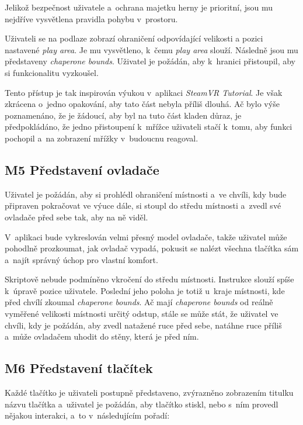 Jelikož bezpečnost uživatele a~ochrana majetku herny je prioritní, jsou mu nejdříve
vysvětlena pravidla pohybu v~prostoru.

Uživateli se na podlaze zobrazí ohraničení odpovídající velikosti a
pozici nastavené \emph{play area}. Je mu vysvětleno, k~čemu \emph{play
area} slouží. Následně jsou mu představeny \emph{chaperone bounds}.
Uživatel je požádán, aby k~hranici přistoupil, aby si funkcionalitu
vyzkoušel.

Tento přístup je tak inspirován výukou v~aplikaci \emph{SteamVR
Tutorial}. Je však zkrácena o~jedno opakování, aby tato část nebyla
příliš dlouhá. Ač bylo výše poznamenáno, že je žádoucí, aby byl na tuto
část kladen důraz, je předpokládáno, že jedno přistoupení k~mřížce uživateli
stačí k~tomu, aby funkci pochopil a~na zobrazení mřížky v~budoucnu
reagoval.

\subsection{M5 Představení
ovladače}\label{m5-pux159edstavenuxed-ovladaux10de}

Uživatel je požádán, aby si prohlédl ohraničení místnosti a~ve chvíli,
kdy bude připraven pokračovat ve výuce dále, si stoupl do středu
místnosti a~zvedl své ovladače před sebe tak, aby na ně viděl.

V~aplikaci bude vykreslován velmi přesný model ovladače, takže uživatel
může pohodlně prozkoumat, jak ovladač vypadá, pokusit se nalézt všechna
tlačítka sám a~najít správný úchop pro vlastní komfort.

Skriptově nebude podmíněno vkročení do středu místnosti.
Instrukce slouží spíše k~úpravě pozice uživatele. Poslední jeho poloha
je totiž u~kraje místnosti, kde před chvílí zkoumal \emph{chaperone
bounds}. Ač mají \emph{chaperone bounds} od reálně vyměřené velikosti místnosti
určitý odstup, stále se může stát, že uživatel ve chvíli, kdy je
požádán, aby zvedl natažené ruce před sebe, natáhne ruce příliš a~může
ovladačem uhodit do stěny, která je před ním.

\subsection{M6 Představení
tlačítek}\label{m6-pux159edstavenuxed-tlaux10duxedtek}

Každé tlačítko je uživateli postupně představeno, zvýrazněno zobrazením
titulku názvu tlačítka a~uživatel je požádán, aby tlačítko stiskl, nebo s~ním
provedl nějakou interakci, a~to v~následujícím pořadí:

